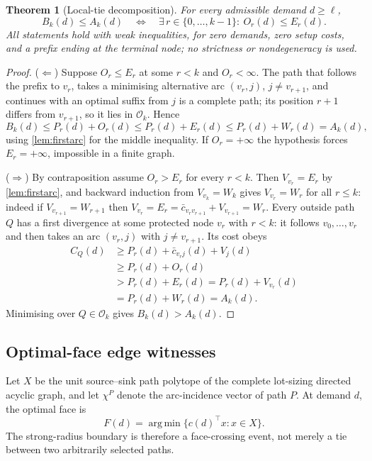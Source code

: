 \documentclass[11pt]{article}
\newtheorem{theorem}{Theorem}[section]
\theoremstyle{definition}
\newcommand{\cO}{\mathcal{O}}
\newcommand{\ellv}{\ell}
\DeclareMathOperator*{\argmin}{arg\,min}
\begin{document}
\begin{theorem}[Local-tie decomposition]\label{thm:localtie}
For every admissible demand $d\ge\ellv$,
\[
B_k(d)\le A_k(d)
\quad\Longleftrightarrow\quad
\exists\,r\in\{0,\ldots,k-1\}:\ O_r(d)\le E_r(d).
\]
All statements hold with weak inequalities, for zero demands, zero setup
costs, and a prefix ending at the terminal node; no strictness or
nondegeneracy is used.
\end{theorem}

\begin{proof}
($\Leftarrow$) Suppose $O_r\le E_r$ at some $r<k$ and $O_r<\infty$. The
path that follows the prefix to $v_r$, takes a minimising alternative arc
$(v_r,j)$, $j\ne v_{r+1}$, and continues with an optimal suffix from $j$
is a complete path; its position $r+1$ differs from $v_{r+1}$, so it lies
in $\cO_k$. Hence
\[
B_k(d)\le P_r(d)+O_r(d)\le P_r(d)+E_r(d)\le P_r(d)+W_r(d)=A_k(d),
\]
using \cref{lem:firstarc} for the middle inequality. If $O_r=+\infty$ the
hypothesis forces $E_r=+\infty$, impossible in a finite graph.

($\Rightarrow$) By contraposition assume $O_r>E_r$ for every $r<k$. Then
$V_{v_r}=E_r$ by \cref{lem:firstarc}, and backward induction from
$V_{v_k}=W_k$ gives $V_{v_r}=W_r$ for all $r\le k$: indeed if
$V_{v_{r+1}}=W_{r+1}$ then
$V_{v_r}=E_r=\bar c_{v_rv_{r+1}}+V_{v_{r+1}}=W_r$. Every outside path $Q$
has a first divergence at some protected node $v_r$ with $r<k$: it
follows $v_0,\ldots,v_r$ and then takes an arc $(v_r,j)$ with
$j\ne v_{r+1}$. Its cost obeys
\begin{align*}
C_Q(d)
&\ge P_r(d)+\bar c_{v_rj}(d)+V_j(d) \\
&\ge P_r(d)+O_r(d) \\
&> P_r(d)+E_r(d)=P_r(d)+V_{v_r}(d) \\
&=P_r(d)+W_r(d)=A_k(d).
\end{align*}
Minimising over $Q\in\cO_k$ gives $B_k(d)>A_k(d)$.
\end{proof}

\subsection{Optimal-face edge witnesses}\label{sec:edgewitness}

Let $X$ be the unit source--sink path polytope of the complete lot-sizing directed acyclic graph, and let $\chi^P$ denote the arc-incidence vector of path $P$. At demand $d$, the optimal face is
\[
F(d)=\argmin\{c(d)^\top x:x\in X\}.
\]
The strong-radius boundary is therefore a face-crossing event, not merely a tie between two arbitrarily selected paths.
\end{document}

